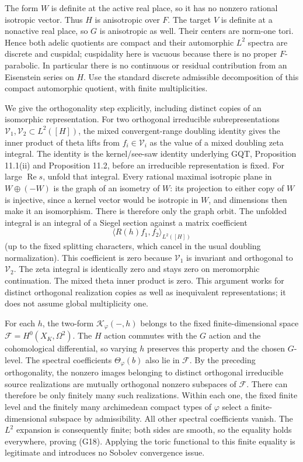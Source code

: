 The form \(W\) is definite at the active real place, so it has no nonzero rational isotropic vector. Thus \(H\) is anisotropic over \(F\). The target \(V\) is definite at a nonactive real place, so \(G\) is anisotropic as well. Their centers are norm-one tori. Hence both adelic quotients are compact and their automorphic \(L^2\) spectra are discrete and cuspidal; cuspidality here is vacuous because there is no proper \(F\)-parabolic. In particular there is no continuous or residual contribution from an Eisenstein series on \(H\). Use the standard discrete admissible decomposition of this compact automorphic quotient, with finite multiplicities.

We give the orthogonality step explicitly, including distinct copies of an isomorphic representation. For two orthogonal irreducible subrepresentations \(\mathcal V_1,\mathcal V_2\subset L^2([H])\), the mixed convergent-range doubling identity gives the inner product of theta lifts from \(f_i\in\mathcal V_i\) as the value of a mixed doubling zeta integral. The identity is the kernel/see-saw identity underlying GQT, Proposition 11.1(ii) and Proposition 11.2, before an irreducible representation is fixed. For large \(\operatorname{Re}s\), unfold that integral. Every rational maximal isotropic plane in \(W\oplus(-W)\) is the graph of an isometry of \(W\): its projection to either copy of \(W\) is injective, since a kernel vector would be isotropic in \(W\), and dimensions then make it an isomorphism. There is therefore only the graph orbit. The unfolded integral is an integral of a Siegel section against a matrix coefficient \[
\langle R(h)f_1,f_2\rangle_{L^2([H])}
\] (up to the fixed splitting characters, which cancel in the usual doubling normalization). This coefficient is zero because \(\mathcal V_1\) is invariant and orthogonal to \(\mathcal V_2\). The zeta integral is identically zero and stays zero on meromorphic continuation. The mixed theta inner product is zero. This argument works for distinct orthogonal realization copies as well as inequivalent representations; it does not assume global multiplicity one.

For each \(h\), the two-form \(\mathcal K_\varphi(-,h)\) belongs to the fixed finite-dimensional space \(\mathcal F=H^0(X_K,\Omega^2)\). The \(H\) action commutes with the \(G\) action and the cohomological differential, so varying \(h\) preserves this property and the chosen \(G\)-level. The spectral coefficients \(\Theta_\varphi(b)\) also lie in \(\mathcal F\). By the preceding orthogonality, the nonzero images belonging to distinct orthogonal irreducible source realizations are mutually orthogonal nonzero subspaces of \(\mathcal F\). There can therefore be only finitely many such realizations. Within each one, the fixed finite level and the finitely many archimedean compact types of \(\varphi\) select a finite-dimensional subspace by admissibility. All other spectral coefficients vanish. The \(L^2\) expansion is consequently finite; both sides are smooth, so the equality holds everywhere, proving (G18). Applying the toric functional to this finite equality is legitimate and introduces no Sobolev convergence issue.

